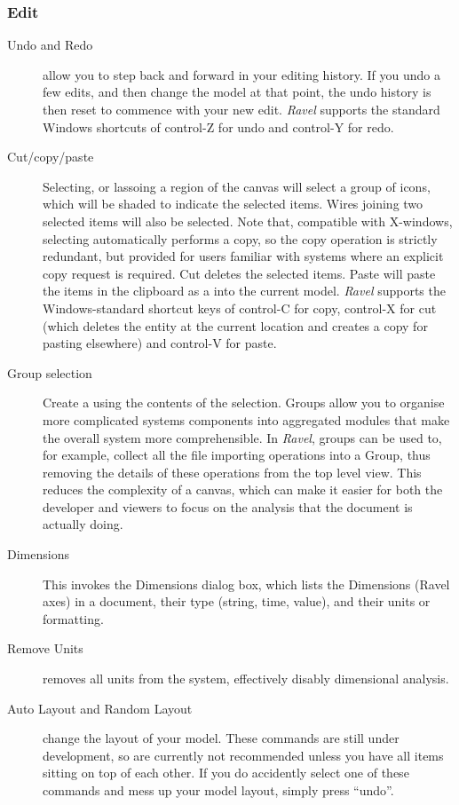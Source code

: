 \subsubsection{Edit}

\label{Edit}
\begin{description}
\item[Undo and Redo] \label{edit:undo}  allow you to step back and forward
in your editing history. If you undo a few edits, and then change
the model at that point, the undo history is then reset to commence
with your new edit. \emph{Ravel} supports the standard Windows shortcuts
of control-Z for undo and control-Y for redo.
\item[Cut/copy/paste] \label{edit:copy}  Selecting, or lassoing a region
of the canvas will select a group of icons, which will be shaded to
indicate the selected items. Wires joining two selected items will
also be selected. Note that, compatible with X-windows, selecting
automatically performs a copy, so the copy operation is strictly redundant,
but provided for users familiar with systems where an explicit copy
request is required. Cut deletes the selected items. Paste will paste
the items in the clipboard as a  into the current
model. \emph{Ravel} supports the Windows-standard shortcut keys of
control-C for copy, control-X for cut (which deletes the entity at
the current location and creates a copy for pasting elsewhere) and
control-V for paste.
\item[Group selection] \label{edit:group} Create a  using
the contents of the selection. Groups allow you to organise more complicated
systems components into aggregated modules that make the overall system
more comprehensible. In \emph{Ravel}, groups can be used to, for example,
collect all the file importing operations into a Group, thus removing
the details of these operations from the top level view. This reduces
the complexity of a canvas, which can make it easier for both the
developer and viewers to focus on the analysis that the document is
actually doing.
\item[Dimensions] \label{edit: Dimensions} This invokes the Dimensions dialog box,
which lists the Dimensions (Ravel axes) in a document, their type
(string, time, value), and their units or formatting.
\item[Remove Units] removes all units from the system, effectively
  disably dimensional analysis.
\item[Auto Layout and Random Layout] change the layout of your
  model. These commands are still under development, so are currently
  not recommended unless you have all items sitting on top of each
  other. If you do accidently select one of these commands and mess up
  your model layout, simply press ``undo''.
\end{description}

